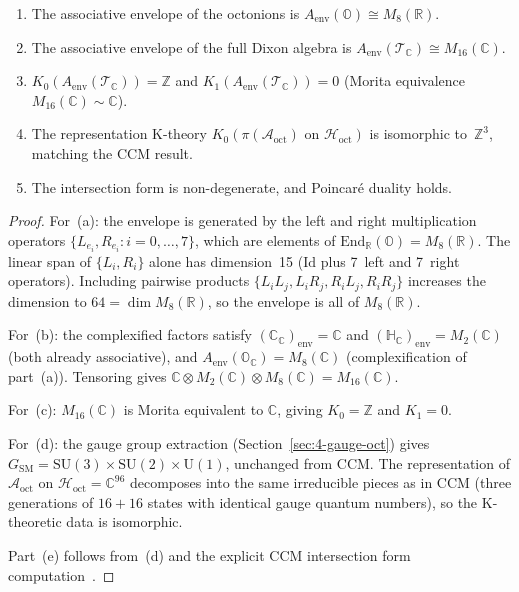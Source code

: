 \begin{theorem}\label{thm:4-5}
\leavevmode
\begin{enumerate}
  \item[\emph{(a)}] The associative envelope of the octonions is $A_{\mathrm{env}}(\mathbb{O}) \cong M_8(\mathbb{R})$.
  \item[\emph{(b)}] The associative envelope of the full Dixon algebra is $A_{\mathrm{env}}(\mathcal{T}_{\mathbb{C}}) \cong M_{16}(\mathbb{C})$.
  \item[\emph{(c)}] $K_0(A_{\mathrm{env}}(\mathcal{T}_{\mathbb{C}})) = \mathbb{Z}$ and $K_1(A_{\mathrm{env}}(\mathcal{T}_{\mathbb{C}})) = 0$ (Morita equivalence $M_{16}(\mathbb{C}) \sim \mathbb{C}$).
  \item[\emph{(d)}] The representation K-theory $K_0(\pi(\mathcal{A}_{\mathrm{oct}}) \text{ on } \mathcal{H}_{\mathrm{oct}})$ is isomorphic to~$\mathbb{Z}^3$, matching the CCM result.
  \item[\emph{(e)}] The intersection form is non-degenerate, and Poincar\'{e} duality holds.
\end{enumerate}
\end{theorem}

\begin{proof}
For~(a): the envelope is generated by the left and right multiplication operators $\{L_{e_i}, R_{e_i} : i = 0, \ldots, 7\}$, which are elements of $\mathrm{End}_{\mathbb{R}}(\mathbb{O}) = M_8(\mathbb{R})$. The linear span of $\{L_i, R_i\}$ alone has dimension~15 ($\mathrm{Id}$ plus 7~left and 7~right operators). Including pairwise products $\{L_i L_j, L_i R_j, R_i L_j, R_i R_j\}$ increases the dimension to $64 = \dim M_8(\mathbb{R})$, so the envelope is all of $M_8(\mathbb{R})$.

For~(b): the complexified factors satisfy $(\mathbb{C}_{\mathbb{C}})_{\mathrm{env}} = \mathbb{C}$ and $(\mathbb{H}_{\mathbb{C}})_{\mathrm{env}} = M_2(\mathbb{C})$ (both already associative), and $A_{\mathrm{env}}(\mathbb{O}_{\mathbb{C}}) = M_8(\mathbb{C})$ (complexification of part~(a)). Tensoring gives $\mathbb{C} \otimes M_2(\mathbb{C}) \otimes M_8(\mathbb{C}) = M_{16}(\mathbb{C})$.

For~(c): $M_{16}(\mathbb{C})$ is Morita equivalent to $\mathbb{C}$, giving $K_0 = \mathbb{Z}$ and $K_1 = 0$.

For~(d): the gauge group extraction (Section~\ref{sec:4-gauge-oct}) gives $G_{\mathrm{SM}} = \mathrm{SU}(3) \times \mathrm{SU}(2) \times \mathrm{U}(1)$, unchanged from CCM. The representation of $\mathcal{A}_{\mathrm{oct}}$ on $\mathcal{H}_{\mathrm{oct}} = \mathbb{C}^{96}$ decomposes into the same irreducible pieces as in CCM (three generations of $16 + 16$ states with identical gauge quantum numbers), so the K-theoretic data is isomorphic.

Part~(e) follows from~(d) and the explicit CCM intersection form computation~\cite{ch4:CCM2007}.
\end{proof}

